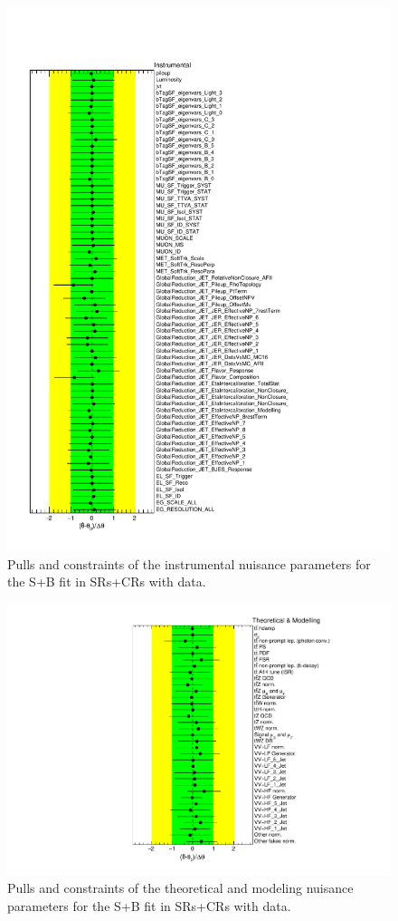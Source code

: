 \begin{figure}[htbp]
	\centering
	\includegraphics[width=.8\textwidth]{Chapters/CH8/figures/SPLUSB_CRSR_DL1rc_unblind/NuisPar_Instrumental}
	\caption{Pulls and constraints of the instrumental nuisance parameters for the S+B \tZc fit in SRs+CRs with data.}%
	\label{fig:stat:tzc:splusb:crsr:np:instr_unb}
\end{figure}

\begin{figure}[htbp]
	\centering
	\includegraphics[width=.85\textwidth]{Chapters/CH8/figures/SPLUSB_CRSR_DL1rc_unblind/NuisPar_Theoretical_&_Modelling}
	\caption{Pulls and constraints of the theoretical and modeling nuisance parameters for the S+B \tZc fit in SRs+CRs with data.}%
	\label{fig:stat:tzc:splusb:crsr:np:model_unb}
\end{figure}

